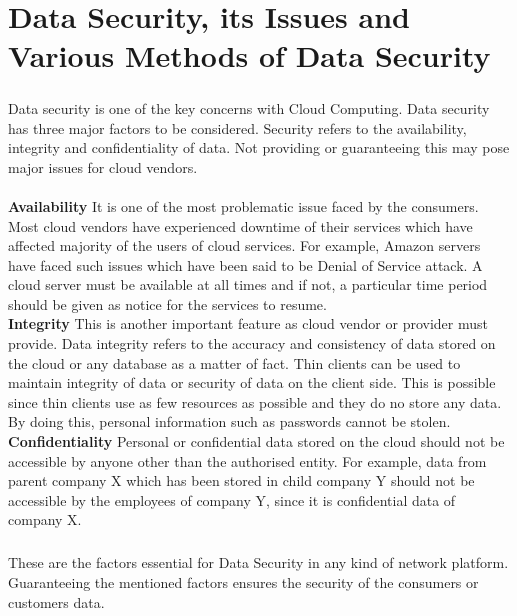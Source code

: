 \chapter{Data Security, its Issues and Various Methods of Data Security}

\paragraph{\hspace{24pt}}
Data security is one of the key concerns with Cloud Computing. Data security has three major factors to be considered. Security refers to the availability, integrity and confidentiality of data. Not providing or guaranteeing this may pose major issues for cloud vendors.\\\\

\textbf{Availability} {It is one of the most problematic issue faced by the consumers. Most cloud vendors have experienced downtime of their services which have affected majority of the users of cloud services. For example, Amazon servers have faced such issues which have been said to be Denial of Service attack. A cloud server must be available at all times and if not, a particular time period should be given as notice for the services to resume.}\\

\textbf{Integrity} {This is another important feature as cloud vendor or provider must provide. Data integrity refers to the accuracy and consistency of data stored on the cloud or any database as a matter of fact. Thin clients can be used to maintain integrity of data or security of data on the client side. This is possible since thin clients use as few resources as possible and they do no store any data. By doing this, personal information such as passwords cannot be stolen.}\\

\textbf{Confidentiality} {Personal or confidential data stored on the cloud should not be accessible by anyone other than the authorised entity. For example, data from parent company X which has been stored in child company Y should not be accessible by the employees of company Y, since it is confidential data of company X.}

\paragraph{\hspace{24pt}}
These are the factors essential for Data Security in any kind of network platform. Guaranteeing the mentioned factors ensures the security of the consumers or customers data.

